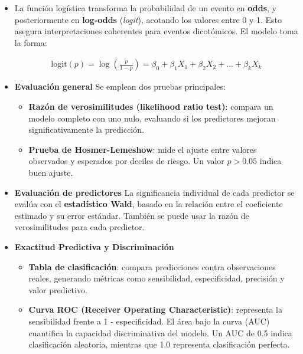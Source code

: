 \documentclass[12pt]{article}
\begin{document}
\begin{itemize}

\item La funci\'on log\'istica transforma la probabilidad de un evento en \textbf{odds}, y posteriormente en \textbf{log-odds} (\textit{logit}), acotando los valores entre 0 y 1. Esto asegura interpretaciones coherentes para eventos dicot\'omicos. El modelo toma la forma:

\begin{eqnarray*}
\text{logit}(p) = \log\left(\frac{p}{1-p}\right) = \beta_0 + \beta_1X_1 + \beta_2X_2 + \ldots + \beta_kX_k
\end{eqnarray*}

\item \textbf{Evaluaci\'on general}
Se emplean dos pruebas principales:
\begin{itemize}
  \item \textbf{Raz\'on de verosimilitudes (likelihood ratio test)}: compara un modelo completo con uno nulo, evaluando si los predictores mejoran significativamente la predicci\'on.
  \item \textbf{Prueba de Hosmer-Lemeshow}: mide el ajuste entre valores observados y esperados por deciles de riesgo. Un valor $p > 0.05$ indica buen ajuste.
\end{itemize}

\item \textbf{Evaluaci\'on de predictores}
La significancia individual de cada predictor se eval\'ua con el \textbf{estad\'istico Wald}, basado en la relaci\'on entre el coeficiente estimado y su error est\'andar. Tambi\'en se puede usar la raz\'on de verosimilitudes para cada predictor.

\item \textbf{Exactitud Predictiva y Discriminaci\'on}

\begin{itemize}
  \item \textbf{Tabla de clasificaci\'on}: compara predicciones contra observaciones reales, generando m\'etricas como sensibilidad, especificidad, precisi\'on y valor predictivo.
  \item \textbf{Curva ROC (Receiver Operating Characteristic)}: representa la sensibilidad frente a 1 - especificidad. El \'area bajo la curva (AUC) cuantifica la capacidad discriminativa del modelo. Un AUC de 0.5 indica clasificaci\'on aleatoria, mientras que 1.0 representa clasificaci\'on perfecta.
\end{itemize}


\end{itemize}
\end{document}
